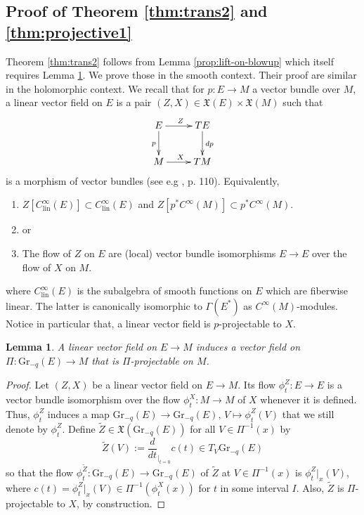 \documentclass[10pt]{article}
\theoremstyle{plain}
\newtheorem{lemma}{Lemma}[section]
\theoremstyle{definition}
\theoremstyle{remark}
\begin{document}
\subsection{Proof of Theorem \ref{thm:trans2} and \ref{thm:projective1}}
Theorem \ref{thm:trans2} follows from Lemma \ref{prop:lift-on-blowup} which itself requires Lemma \ref{lemma:vf-Gr}. We prove those in the smooth context. Their proof are similar in the holomorphic context. We recall that for $p\colon E\longrightarrow M$ a vector bundle over $M$, a linear vector field on $E$ is a pair $(Z,X)\in \mathfrak{X}(E)\times \mathfrak{X}(M)$ such that
$$\xymatrix{E\ar[r]^Z \ar[d]_p&TE\ar[d]^{dp}\\M\ar[r]^X&TM}$$
is a morphism of vector bundles (see e.g \cite{Mackenzie-Kirill}, p. 110). Equivalently, 

\begin{enumerate}
    \item $Z[C_{\mathrm{lin}}^\infty(E)]\subset C_{\mathrm{lin}}^\infty(E)$ and $Z[p^*C^\infty(M)]\subset p^*C^\infty(M)$.
    \item[] or
    \item The flow of $Z$ on $E$ are (local) vector bundle isomorphisms $E\longrightarrow E$ over the flow of $X$ on $M$.
\end{enumerate}
where $C_{\mathrm{lin}}^\infty(E)$ is the subalgebra of smooth functions on $E$ which are fiberwise linear. The latter is canonically isomorphic to $\Gamma(E^*)$ as $C^\infty(M)$-modules. Notice in particular that, a linear vector field is $p$-projectable to $X$.
\begin{lemma}\label{lemma:vf-Gr}
  A linear vector field on $E\longrightarrow M$ induces a vector field on $\Pi\colon \mathrm{Gr}_{-q}(E)\longrightarrow M$ that is $\Pi$-projectable on $M$.  
\end{lemma}
\begin{proof}
Let $(Z,X)$ be a linear vector field on $E\longrightarrow M$. Its flow $\phi^{Z}_t\colon E\longrightarrow E$ is a vector bundle isomorphism over the flow $\phi^X_t\colon M\to M$ of $X$   whenever it is defined. Thus, %
$\phi^{Z}_t$ induces a map $\mathrm{Gr}_{-q}(E)\longrightarrow \mathrm{Gr}_{-q}(E),\, V\mapsto \phi^{Z}_t(V)$ that we still denote by $\phi^{Z}_t$. 
Define ${\widetilde Z}\in \mathfrak X(\mathrm{Gr}_{-q}(E))$ for all $V\in \Pi^{-1}(x)$ by \begin{equation}
    \label{eq:pull-back-gr}{\widetilde Z}(V):=\frac{d}{dt}_{|_{t=0}}c(t)\in T_{V}\mathrm{Gr}_{-q}(E)
\end{equation}
so that  the flow  $\phi^{\widetilde Z}_t\colon \mathrm{Gr}_{-q}(E)\longrightarrow \mathrm{Gr}_{-q}(E)$  of $\widetilde Z$ at $V\in\Pi^{-1}(x)$ is  $\phi^{Z}_t|_x(V)$, where $c(t)=\phi^{Z}_t|_x(V)\in \Pi^{-1}(\phi^{X}_t(x))$ for $t$ in some interval $I$. Also, $\widetilde Z$ is $\Pi$-projectable to $X$, by construction. %
\end{proof}
\end{document}
